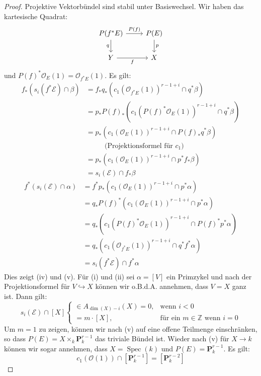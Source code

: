 \documentclass[10pt,a4paper]{article}
\begin{document}
\begin{proof}
Projektive Vektorbündel sind stabil unter Basiswechsel. Wir haben das kartesische Quadrat:
\[ \begin{tikzcd}
P(f^\ast E) \rar["P(f)"]\dar["q"'] & P(E) \dar["p"] \\
Y \rar["f"'] & X
\end{tikzcd} \]
und $P(f)^\ast\mathcal{O}_E(1) = \mathcal{O}_{f^\ast E}(1)$. Es gilt:
\begin{align*}
f_\ast(s_i(f^\ast\mathcal{E})\cap\beta) &= f_\ast q_\ast(c_1(\mathcal{O}_{f^\ast E}(1))^{r-1+i}\cap q^\ast \beta)\\
&= p_\ast P(f)_\ast (c_1(P(f)^\ast\mathcal{O}_E(1))^{r-1+i}\cap q^\ast\beta)\\
&= p_\ast(c_1(\mathcal{O}_E(1))^{r-1+i}\cap P(f)_\ast q^\ast\beta) \\
&\phantom{==} \text{(Projektionsformel für $c_1$)}\\
&= p_\ast(c_1(\mathcal{O}_E(1))^{r-1+i}\cap p^\ast f_\ast\beta)\\
&= s_i(\mathcal{E})\cap f_\ast\beta
\end{align*}
\begin{align*}
f^\ast(s_i(\mathcal{E})\cap\alpha) &= f^\ast p_\ast(c_1(\mathcal{O}_E(1))^{r-1+i}\cap p^\ast\alpha)\\
&= q_\ast P(f)^\ast(c_1(\mathcal{O}_E(1))^{r-1+i}\cap p^\ast \alpha)\\
&= q_\ast(c_1(P(f)^\ast\mathcal{O}_{E}(1))^{r-1+i}\cap P(f)^\ast p^\ast \alpha)\\
&= q_\ast(c_1(\mathcal{O}_{f^\ast E}(1))^{r-1+i}\cap q^\ast f^\ast \alpha)\\
&= s_i(f^\ast\mathcal{E})\cap f^\ast\alpha
\end{align*}
Dies zeigt (iv) und (v). Für (i) und (ii) sei $\alpha = [V]$ ein Primzykel und nach der Projektionsformel für $V\hookrightarrow X$ können wir o.B.d.A. annehmen, dass $V=X$ ganz ist. Dann gilt:
\[s_i(\mathcal{E})\cap [X] \begin{cases}
\in A_{\dim(X)-i}(X) = 0, & \text{wenn $i<0$}\\
= m\cdot [X], & \text{für ein $m\in \mathbb{Z}$ wenn $i = 0$}
\end{cases}
\]
Um $m=1$ zu zeigen, können wir nach (v) auf eine offene Teilmenge einschränken, so dass $P(E)=X\times_k\mathbf{P}^{r-1}_k$ das triviale Bündel ist. Wieder nach (v) für $X\to k$ können wir sogar annehmen, dass $X=\operatorname{Spec}(k)$ und $P(E)=\mathbf{P}_k^{r-1}$. Es gilt:
\[ c_1(\mathcal{O}(1))\cap [\mathbf{P}_k^{r-1}] = [\mathbf{P}_k^{r-2}] \]

\end{proof}
\end{document}
